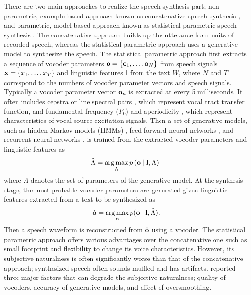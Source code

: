 There are two main approaches to realize the speech synthesis part; non-parametric, example-based approach known as concatenative speech synthesis \citep{PSOLA,ATR_nutalk,Hunt_UnitSelection_ICASSP}, and parametric, model-based approach known as statistical parametric speech synthesis \citep{yoshimura_PhD,Zen_SPSS_SPECOM}.
The concatenative approach builds up the utterance from units of recorded speech, whereas the statistical parametric approach uses a generative model to synthesize the speech.
The statistical parametric approach first extracts a sequence of vocoder parameters \citep{Vocoder} $\mathbf{o} = \{ \mathbf{o}_1, \dots, \mathbf{o}_N \}$ from speech signals $\mathbf{x} = \{ x_1, \dots, x_T \}$ and linguistic features $\mathbf{l}$ from the text $W$, where $N$ and $T$ correspond to the numbers of vocoder parameter vectors and speech signals.
Typically a vocoder parameter vector $\mathbf{o}_n$ is extracted at every 5 milliseconds.
It often includes cepstra \citep{UELS} or line spectral pairs \citep{LSP}, which represent 
vocal tract transfer function, and fundamental
frequency ($F_0$) and aperiodicity \citep{Kawahara_STRAIGHT_Excitation}, which represent characteristics of vocal source excitation signals.
Then a set of generative models, such as hidden Markov models (HMMs) \citep{yoshimura_PhD}, feed-forward neural networks \citep{Zen_DNN_ICASSP}, and recurrent neural networks \citep{Robinson_RNNTTS,Karaani_RTDNNTTS,Fan_BLSTM_Interspeech14}, is trained from the extracted vocoder parameters and linguistic features as
\begin{equation}
  \hat{\Lambda} = \argmax_{\Lambda} p\left( \bo \mid \bl, \Lambda \right),
\end{equation}
where $\Lambda$ denotes the set of parameters of the generative model.
At the synthesis stage, the most probable vocoder parameters are generated given linguistic features extracted from a text to be synthesized as
\begin{equation}
  \hat{\bo} = \argmax_{\bo} p ( \bo \mid \bl, \hat{\Lambda} ).
\end{equation}
Then a speech waveform is reconstructed from $\hat{\mathbf{o}}$ using a vocoder.
The statistical parametric approach offers various advantages over the
concatenative one such as small footprint
and flexibility to change its voice characteristics.
However, its subjective naturalness is often significantly worse than that of the concatenative approach; synthesized speech often sounds muffled and has artifacts.
\cite{Zen_SPSS_SPECOM} reported three major factors that can degrade the subjective naturalness; quality of vocoders, accuracy of generative models, and effect of oversmoothing.
